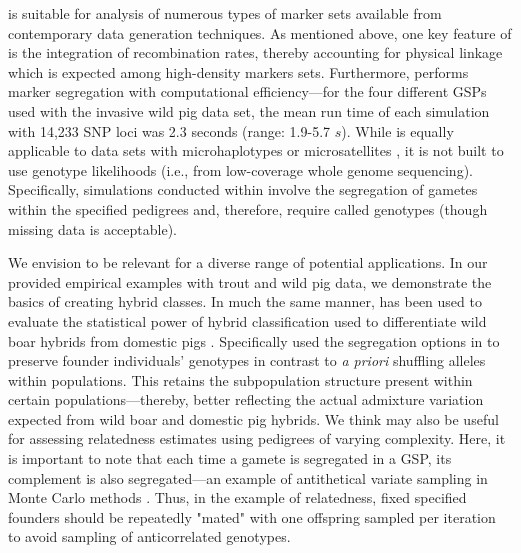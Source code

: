 {\gscramble{} is suitable for analysis of numerous types of marker sets available from contemporary data generation 
techniques. As mentioned above, 
one key feature of \gscramble{} is the integration of recombination rates, thereby accounting for physical 
linkage which is expected among high-density markers sets. Furthermore, \gscramble{} performs marker 
segregation with computational efficiency---for the four different GSPs used with the invasive wild pig data set, 
the mean run time of each simulation with 14,233 SNP loci was 2.3 seconds (range: 1.9-5.7 $s$). 
While \gscramble{} is equally applicable to data sets with 
microhaplotypes \citep{baetscher2018microhaplotypes} or microsatellites \citep{zhan2017megasat}, 
it is not built to use genotype likelihoods (i.e., from low-coverage whole genome sequencing). 
Specifically, simulations conducted within \gscramble{} involve the segregation of gametes within the 
specified pedigrees and, therefore, require called genotypes (though missing data is acceptable). 

We envision \gscramble{} to be relevant for a diverse range of potential applications. In our 
provided empirical examples with trout and wild pig data, we demonstrate the basics of 
creating hybrid classes. In much the same manner, \gscramble{} has been used to evaluate the statistical power 
of hybrid classification used to differentiate wild boar hybrids from domestic pigs 
\citep{smyser2024probgen}. Specifically \citet{smyser2024probgen} used the segregation options in \gscramble{} 
 to preserve founder individuals' genotypes in contrast to \textit{a priori} shuffling alleles 
within populations. This retains the subpopulation structure present within certain populations---thereby, better reflecting the 
actual admixture variation expected from wild boar and domestic pig hybrids. We think \gscramble{} 
may also be useful for assessing relatedness estimates using pedigrees of varying complexity. Here, it 
is important to note that each time a gamete is segregated in a GSP, its complement is also 
segregated---an example of antithetical variate sampling in Monte Carlo methods \citep{hammersley}.
Thus, in the  example of relatedness, fixed specified founders should be repeatedly "mated" with one offspring 
sampled per iteration to avoid sampling of anticorrelated genotypes.


}
